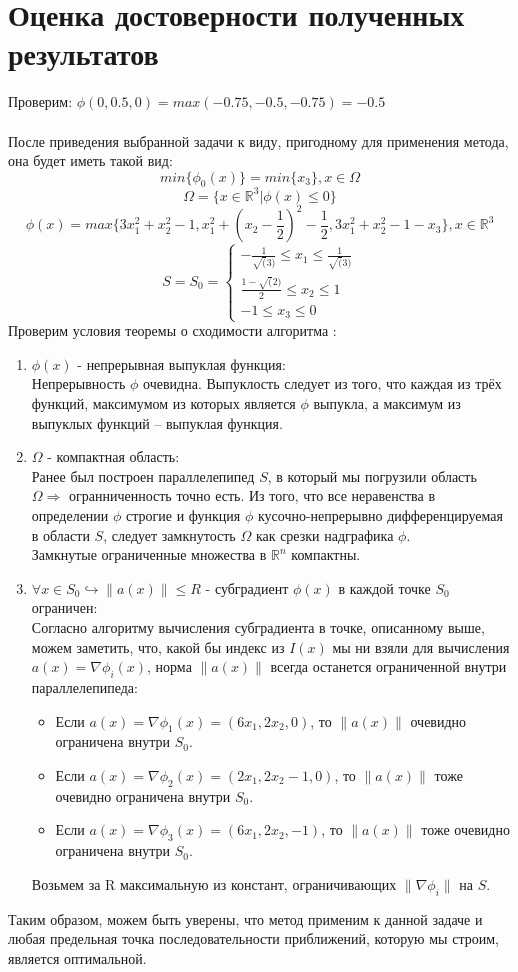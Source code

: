 \documentclass[main.tex]{subfiles}
\begin{document}
\section{Оценка достоверности полученных результатов}
Проверим: $\phi(0, 0.5, 0) = max(-0.75, -0.5, -0.75) = -0.5$\\ \\
После приведения выбранной задачи к виду, пригодному для применения метода, она будет иметь такой вид: 
$$min\{\phi_0(x)\} = min\{x_3\}, x \in \Omega$$
$$\Omega = \{x \in \mathds{R}^3 | \phi(x) \leq 0\}$$
$$\phi(x) = max\{3x_1^2 + x_2^2 - 1, x_1^2 + (x_2 -\frac{1}{2})^2 - \frac{1}{2}, 3x_1^2 + x_2^2 - 1 - x_3\}, x \in \mathds{R}^3$$
\begin{equation*}
S = S_0 = 
\begin{cases}
-\frac{1}{\sqrt(3)} \leq x_1 \leq \frac{1}{\sqrt(3)}\\
\frac{1-\sqrt(2)}{2} \leq x_2 \leq 1\\
-1 \leq x_3 \leq 0
\end{cases}
\end{equation*}
Проверим условия теоремы о сходимости алгоритма \cite{petuh}:
\begin{enumerate}
	\item $\phi(x)$ - непрерывная выпуклая функция:\\
	Непрерывность $\phi$ очевидна.
	Выпуклость следует из того, что каждая из трёх функций, максимумом из которых является $\phi$ выпукла, а максимум из выпуклых функций -- выпуклая функция.
	\item $\Omega$ - компактная область:\\
	Ранее был построен параллелепипед $S$, в который мы погрузили область $\Omega \Longrightarrow$ огранниченность точно есть.
	Из того, что все неравенства в определении $\phi$ строгие и функция $\phi$ кусочно-непрерывно дифференцируемая в области $S$, следует замкнутость $\varOmega$ как срезки надграфика $\phi$.\\
	Замкнутые ограниченные множества в $\mathds{R}^n$ компактны.
	\item $\forall x \in S_0 \hookrightarrow \|a(x)\| \leq R$ - субградиент $\phi(x)$ в каждой точке $S_0$ ограничен:\\
	Согласно алгоритму вычисления субградиента в точке, описанному выше, можем заметить, что, какой бы индекс из $I(x)$ мы ни взяли для вычисления $a(x) = \nabla \phi_i(x)$, норма $\|a(x)\|$ всегда останется ограниченной внутри параллелепипеда:
	\begin{itemize}
		\item Если $a(x) = \nabla\phi_1(x) = (6x_1, 2x_2, 0)$, то $\|a(x)\|$ очевидно ограничена внутри $S_0$.
		\item Если $a(x) = \nabla\phi_2(x) = (2x_1, 2x_2 - 1, 0)$, то $\|a(x)\|$ тоже очевидно ограничена внутри $S_0$.
		\item Если $a(x) = \nabla\phi_3(x) = (6x_1, 2x_2, -1)$, то $\|a(x)\|$ тоже очевидно ограничена внутри $S_0$.
	\end{itemize}
	Возьмем за R максимальную из констант, ограничивающих $\|\nabla\phi_i\|$ на $S$.
\end{enumerate}
Таким образом, можем быть уверены, что метод применим к данной задаче и любая предельная точка последовательности приближений, которую мы строим, является оптимальной.
\end{document}
